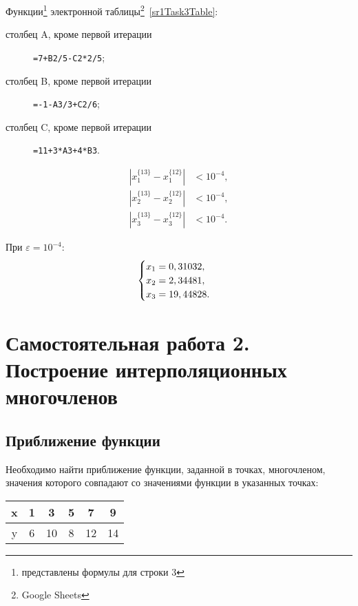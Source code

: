 \documentclass[10pt, a4paper, titlepage]{article}
\begin{document}
Функции\footnote{представлены формулы для строки 3} электронной таблицы\footnote{Google Sheets}~\ref{sr1Task3Table}:
\begin{description}
    \item[столбец A, кроме первой итерации] \verb"=7+B2/5-C2*2/5";
    
    \item[столбец B, кроме первой итерации]  \verb"=-1-A3/3+C2/6";
    
    \item[столбец C, кроме первой итерации] \verb"=11+3*A3+4*B3".
    
\end{description}

\begin{align*}
    \left|x_1^{\{13\}}-x_1^{\{12\}}\right| &< 10^{-4}, \\
    \left|x_2^{\{13\}}-x_2^{\{12\}}\right| &< 10^{-4}, \\
    \left|x_3^{\{13\}}-x_3^{\{12\}}\right| &< 10^{-4}.
\end{align*}

При $\varepsilon=10^{-4}$:
\begin{equation*}
    \begin{cases}
        $$x_1=0,31032$$, \\
        $$x_2=2,34481$$, \\
        $$x_3=19,44828$$.
    \end{cases}
\end{equation*}

\clearpage
\section{Самостоятельная работа \textnumero{} 2. Построение интерполяционных многочленов}

\subsection*{Приближение функции}

Необходимо найти приближение функции, заданной в точках, многочленом, значения которого совпадают со значениями функции в указанных точках:

\begin{center}
    \begin{tabular}{|*{6}{C|}}
         \hline
         x & 1 & 3 & 5 & 7 & 9 \\ \hline
         y & 6 & 10 & 8 & 12 & 14 \\
         \hline
    \end{tabular}
\end{center}
\end{document}
